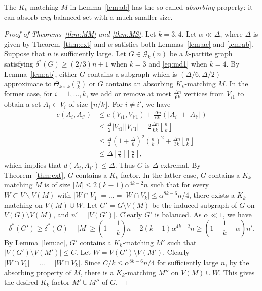\documentclass[reqno]{amsart}
\theoremstyle{plain}
\def\a{\alpha}
\def\G{\mathcal{G}}
\begin{document}
The $K_k$-matching $M$ in Lemma~\ref{lem:ab} has the so-called \emph{absorbing}  property: it can absorb \emph{any} balanced set with a much smaller size.

\begin{proof}[Proof of Theorems~\ref{thm:MM} and \ref{thm:MS}]
Let $k= 3, 4$. Let $\alpha \ll \Delta$, where $\Delta$ is given by Theorem~\ref{thm:ext} and $\alpha$ satisfies both Lemmas~\ref{lem:ac} and \ref{lem:ab}. Suppose that $n$ is sufficiently large. Let $G\in \G_k(n)$ be a $k$-partite graph satisfying ${\delta}^*(G)\ge (2/3)n+1$ when $k=3$ and \eqref{eq:md1} when $k=4$.  By Lemma~\ref{lem:ab}, either $G$ contains a subgraph which is $({\Delta}/{6}, {\Delta}/{2})$-approximate to $\Theta_{k\times k}(\tfrac n k)$ or $G$ contains an absorbing $K_k$-matching $M$. In the former case, for $i=1, \dots, k$, we add or remove at most $\frac{\Delta n}{6k}$ vertices from $V_{i1}$ to obtain a set $A_i\subset V_i$ of size $\lfloor n/k \rfloor$. For $i\ne i'$, we have
\begin{align*}
e(A_i, A_{i'}) & \le e(V_{i1}, V_{i'1}) + \frac{\Delta n}{6k} (|A_i| + |A_{i'}|) \\
& \le \frac{\Delta}{2} |V_{i1}| |V_{i'1}| + 2 \frac{\Delta n}{6k} \left\lfloor \frac{n}{k} \right\rfloor \\
& \le \frac{\Delta}{2}  \left(1 + \frac{\Delta}{6} \right)^2 \left(\frac{n}{k} \right)^2 +  \frac{\Delta n}{3 k} \left\lfloor \frac{n}{k} \right\rfloor  \\
& \le \Delta \left\lfloor \frac{n}{k} \right\rfloor \left\lfloor \frac{n}{k} \right\rfloor,
\end{align*}
which implies that $d(A_i, A_{i'})\le \Delta$. Thus $G$ is $\Delta$-extremal. By Theorem~\ref{thm:ext}, $G$ contains a $K_k$-factor.  In the latter case, $G$ contains a $K_k$-matching $M$ is of size $|M|\le 2(k-1)\alpha^{4k-2}n $ such that for every $W\subset V\backslash V(M)$ with $|W\cap V_1| = \dots = |W\cap V_k| \le  \alpha^{8k-6}n/4$, there exists a $K_k$-matching on $V(M)\cup W$.  Let $G' = G\setminus V(M)$ be the induced subgraph of $G$ on $V(G)\setminus V(M)$, and $n' = |V(G')|$. Clearly $G'$ is balanced. As $\alpha \ll 1$, we have
\[
\delta^*(G')\ge \delta^*(G) - |M| \ge \left(1 - \frac{1}{k} \right)n - 2(k-1)\alpha^{4k-2}n \ge \left(1- \frac{1}{k} - \alpha \right) n'.
\]
By Lemma~\ref{lem:ac}, $G'$ contains a $K_k$-matching $M'$ such that $|V(G')\setminus V(M')| \le C$. Let $W= V(G')\setminus V(M')$. Clearly $|W\cap V_1| = \dots = |W\cap V_k|$. Since $C/k\le \a^{8k-6}n/4$ for sufficiently large $n$, by the absorbing property of $M$,  there is a $K_k$-matching $M''$ on $V(M)\cup W$. This gives the desired $K_k$-factor $M'\cup M''$ of $G$.
\end{proof}
\end{document}
